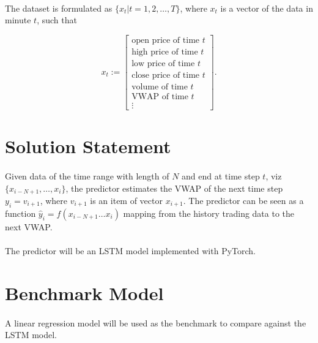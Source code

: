\documentclass[12pt, letterpaper]{article}
\begin{document}
\paragraph{}
The dataset is formulated as \(\{x_t|t=1,2,\dots,T\}\), where \(x_t\) is a vector of the data in minute \(t\), such that

\begin{equation*}
    x_t := \begin{bmatrix}
        \text{open price of time }t \\
        \text{high price of time }t \\
        \text{low price of time }t \\
        \text{close price of time }t \\
        \text{volume of time }t \\
        \text{VWAP of time }t \\
        \vdots
    \end{bmatrix}.
\end{equation*}

\section{Solution Statement}

\paragraph{}
Given data of the time range with length of \(N\) and end at time step \(t\), viz \(\{x_{i-N+1},\dots,x_i\}\), the predictor estimates the VWAP of the next time step \(y_i=v_{i+1}\), where \(v_{i+1}\) is an item of vector \(x_{i+1}\). The predictor can be seen as a function \(\hat y_i=f(x_{i-N+1}\dots x_i)\) mapping from the history trading data to the next VWAP\@.

\paragraph{}
The predictor will be an LSTM model implemented with PyTorch.

\section{Benchmark Model}

\paragraph{}
A linear regression model will be used as the benchmark to compare against the LSTM model.
\end{document}
